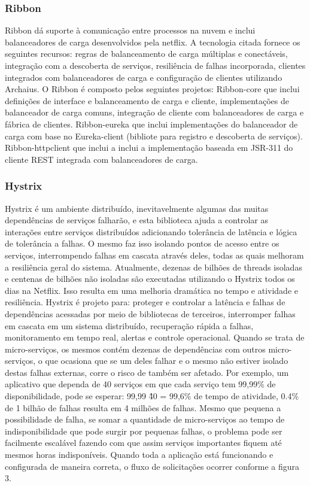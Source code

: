 \subsubsection{Ribbon}
Ribbon dá suporte à comunicação entre processos na nuvem e inclui balanceadores de carga desenvolvidos pela netflix. A tecnologia citada fornece os seguintes recursos: regras de balanceamento de carga múltiplas e conectáveis, integração com a descoberta de serviços, resiliência de falhas incorporada, clientes integrados com balanceadores de carga e configuração de clientes utilizando Archaius. O Ribbon é composto pelos seguintes projetos: Ribbon-core que inclui definições de interface e balanceamento de carga e cliente, implementações de balanceador de carga comuns, integração de cliente com balanceadores de carga e fábrica de clientes. Ribbon-eureka que inclui implementações do balanceador de carga com base no Eureka-client (bibliote para registro e descoberta de serviços). Ribbon-httpclient que inclui a inclui a implementação baseada em JSR-311 do cliente REST integrada com balanceadores de carga.

\subsubsection{Hystrix}
Hystrix é um ambiente distribuído, inevitavelmente algumas das muitas dependências de serviços falharão, e esta biblioteca ajuda a controlar as interações entre serviços distribuídos adicionando tolerância de latência e lógica de tolerância a falhas. O mesmo faz isso isolando pontos de acesso entre os serviços, interrompendo falhas em cascata através deles, todas as quais melhoram a resiliência geral do sistema. Atualmente, dezenas de bilhões de threads isoladas e centenas de bilhões não isoladas são executadas utilizando o Hystrix todos os dias na Netflix. Isso resulta em uma melhoria dramática no tempo e atividade e resiliência. Hystrix é projeto para: proteger e controlar a latência e falhas de dependências acessadas por meio de bibliotecas de terceiros, interromper falhas em cascata em um sistema distribuído, recuperação rápida a falhas, monitoramento em tempo real, alertas e controle operacional. Quando se trata de micro-serviços, os mesmos contém dezenas de dependências com outros micro-serviços, o que ocasiona que se um deles falhar e o mesmo não estiver isolado destas falhas externas, corre o risco de também ser afetado. Por exemplo, um aplicativo que dependa de 40 serviços em que cada serviço tem 99,99\% de disponibilidade, pode se esperar: 99,99 \^ 40 = 99,6\% de tempo de atividade, 0.4\% de 1 bilhão de falhas resulta em 4 milhões de falhas. Mesmo que pequena a possibilidade de falha, se somar a quantidade de micro-serviços ao tempo de indisponibilidade que pode surgir por pequenas falhas, o problema pode ser facilmente escalável fazendo com que assim serviços importantes fiquem até mesmos horas indisponíveis. Quando toda a aplicação está funcionando e configurada de maneira correta, o fluxo de solicitações ocorrer conforme a figura 3.

